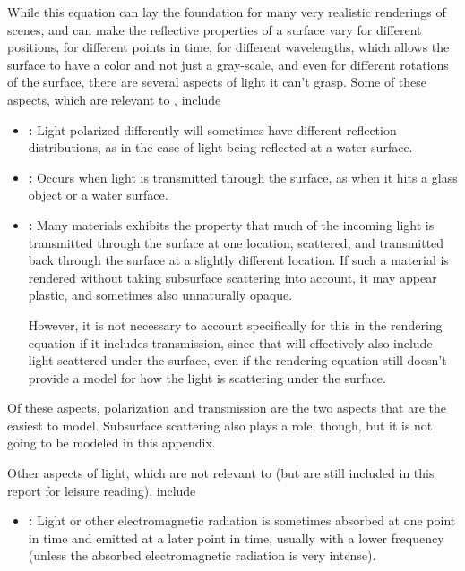{While this equation can lay the foundation for many very realistic renderings of \threedimensional scenes, and can make the reflective properties of a surface vary for different positions, for different points in time, for different wavelengths, which allows the surface to have a color and not just a gray-scale, and even for different rotations of the surface, there are several aspects of light it can't grasp. Some of these aspects, which are relevant to \surfacewaterrendering, include

\begin{itemize}
\item \textbf{:} Light polarized differently will sometimes have different reflection distributions, as in the case of light being reflected at a water surface.

\item \textbf{:} Occurs when light is transmitted through the surface, as when it hits a glass object or a water surface.

\item \textbf{:} Many materials exhibits the property that much of the incoming light is transmitted through the surface at one location, scattered, and transmitted back through the surface at a slightly different location. If such a material is rendered without taking subsurface scattering into account, it may appear plastic, and sometimes also unnaturally opaque.

However, it is not necessary to account specifically for this in the rendering equation if it includes transmission, since that will effectively also include light scattered under the surface, even if the rendering equation still doesn't provide a model for how the light is scattering under the surface.
\end{itemize}

Of these aspects, polarization and transmission are the two aspects that are the easiest to model. Subsurface scattering also plays a role, though, but it is not going to be modeled in this appendix.

Other aspects of light, which are not relevant to \surfacewaterrendering (but are still included in this report for leisure reading), include

\begin{itemize}
\item \textbf{:} Light or other electromagnetic radiation is sometimes absorbed at one point in time and emitted at a later point in time, usually with a lower frequency (unless the absorbed electromagnetic radiation is very intense).


\end{itemize}}
